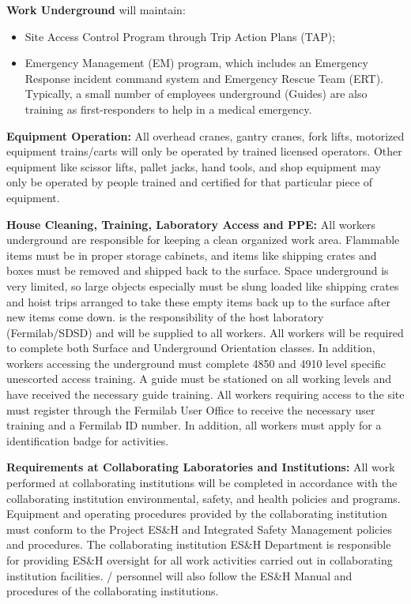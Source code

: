 {\bf Work Underground } will maintain:
\begin{itemize}
    \item Site Access Control Program through Trip Action Plans (TAP);
    \item Emergency Management (EM) program, which includes an Emergency Response incident command system and  Emergency Rescue Team (ERT).  Typically, a small number of employees underground (Guides) are also training as first-responders to help in a medical emergency.
    
\end{itemize}

{\bf Equipment Operation:} All overhead cranes, gantry cranes, fork lifts, motorized equipment trains/carts will only be operated by trained licensed operators. 
Other equipment like scissor lifts, pallet jacks, hand tools, and shop equipment may only be operated by people trained
and certified for that particular piece of equipment.

{\bf House Cleaning, Training, Laboratory Access and PPE:} All workers underground are responsible for keeping a clean organized work area. Flammable items must be in proper storage cabinets, and items like shipping crates and boxes must be removed and shipped back to the surface. Space underground is very limited, so large objects especially must be slung loaded like shipping crates and hoist trips arranged to take these empty items back up to the surface after new items come down.  is the responsibility of the host laboratory (Fermilab/SDSD) and will be supplied to all workers. All workers will be required to complete both  Surface and Underground Orientation classes. In addition, workers accessing the underground must complete 4850 and 4910 level specific unescorted access training. A guide must be stationed on all working levels and have received the necessary guide training. All workers requiring access to the  site must register through the Fermilab User Office to receive the necessary user training and a Fermilab ID number. In addition, all workers must apply for a  identification badge for  activities.

{\bf Requirements at Collaborating Laboratories and Institutions:} All work performed at collaborating institutions will be completed in accordance with the collaborating institution environmental, safety, and health policies and programs. 
Equipment and operating procedures provided by the collaborating institution must conform to the  Project ES\&H and Integrated Safety Management policies and procedures. 
The collaborating institution ES\&H Department is responsible for providing ES\&H oversight for all work activities carried out in collaborating institution facilities. 
/ personnel will also follow the ES\&H Manual and procedures of the collaborating institutions.


